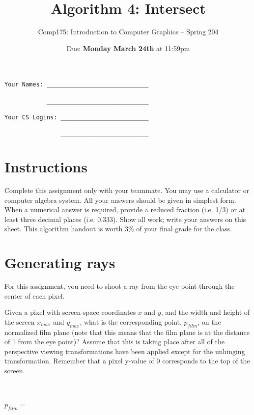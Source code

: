 \documentclass[10pt,twocolumn]{article}
\title{\Huge{\bf Algorithm 4: Intersect}}
\author{Comp175: Introduction to Computer Graphics -- Spring 204}
\date{Due:  {\bf Monday March 24th} at 11:59pm}                                           %
\begin{document}
\maketitle

\begin{verbatim}
Your Names: _____________________________

            _____________________________

Your CS Logins: _________________________

                _________________________
\end{verbatim}

\section{Instructions}
Complete this assignment only with your teammate. You may use a calculator or computer algebra system. All your answers should be given in simplest form. When a numerical answer is required, provide a reduced fraction (i.e. 1/3) or at least three decimal places (i.e. 0.333). Show all work; write your answers on this sheet. This algorithm handout is worth 3\% of your final grade for the class.

\section{Generating rays}
For this assignment, you need to shoot a ray from the eye point through the center of each pixel.

\begin{framed}
\noindent {\bf [1 point]} Given a pixel with screen-space coordinates $x$ and $y$, and the width and height of the screen $x_{max}$ and $y_{max}$, what is the corresponding point, $p_{film}$, on the normalized film plane (note that this means that the film plane is at the distance of 1 from the eye point)? Assume that this is taking place after all of the perspective viewing transformations have been applied except for the unhinging transformation. Remember that a pixel y-value of 0 corresponds to the top of the screen.\\\\\\\\
$p_{film} =$\\\\\\
\end{framed}
\end{document}
